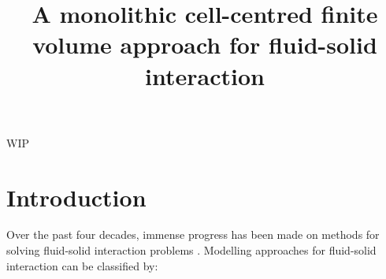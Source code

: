 \documentclass[sn-mathphys,Numbered]{sn-jnl}%
\begin{document}
\title[Article Title]{A monolithic cell-centred finite volume approach for fluid-solid interaction}

\author*[1]{ }




\abstract
{
WIP
}




\maketitle


\section{Introduction}\label{sec:intro}
%


Over the past four decades, immense progress has been made on methods for solving fluid-solid interaction problems \citep{belytschko1980quasi, donea1982arbitrary, van2021vanguard}. Modelling approaches for fluid-solid interaction can be classified by:
\end{document}
